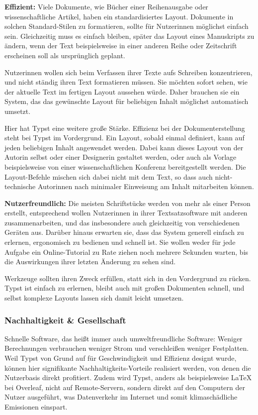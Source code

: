 \documentclass[11pt, a4paper]{article}
\newcommand{\gender}{\raisebox{-.25em}{*}}
\begin{document}
\textbf{Effizient:} Viele Dokumente, wie Bücher einer Reihenausgabe oder wissenschaftliche Artikel, haben ein standardisiertes Layout. Dokumente in solchen Standard-Stilen zu formatieren, sollte für Nutzer\gender{}innen möglichst einfach sein. Gleichzeitig muss es einfach bleiben, später das Layout eines Manuskripts zu ändern, wenn der Text beispielsweise in einer anderen Reihe oder Zeitschrift erscheinen soll als ursprünglich geplant.

Nutzer\gender{}innen wollen sich beim Verfassen ihrer Texte aufs Schreiben konzentrieren, und nicht  ständig ihren Text formatieren müssen. Sie möchten sofort sehen, wie der aktuelle Text im fertigen Layout aussehen würde. Daher brauchen sie ein System, das das gewünschte Layout für beliebigen Inhalt möglichst automatisch umsetzt.

Hier hat Typst eine weitere große Stärke. Effizienz bei der Dokumenterstellung steht bei Typst im Vordergrund. Ein Layout, sobald einmal definiert, kann auf jeden beliebigen Inhalt angewendet werden. Dabei kann dieses Layout von der\gender{} Autor\gender{}in selbst oder einer\gender{} Designer\gender{}in gestaltet werden, oder auch als Vorlage beispielsweise von einer wissenschaftlichen Konferenz bereitgestellt werden. Die Layout-Befehle mischen sich dabei nicht mit dem Text, so dass auch nicht-technische Autor\gender{}innen nach minimaler Einweisung am Inhalt mitarbeiten können.

\textbf{Nutzerfreundlich:} Die meisten Schriftstücke werden von mehr als einer Person erstellt, entsprechend wollen Nutzer\gender{}innen in ihrer Textsatzsoftware mit anderen zusammenarbeiten, und das insbesondere auch gleichzeitig von verschiedenen Geräten aus. Darüber hinaus erwarten sie, dass das System generell einfach zu erlernen, ergonomisch zu bedienen und schnell ist. Sie wollen weder für jede Aufgabe ein Online-Tutorial zu Rate ziehen noch mehrere Sekunden warten, bis die Auswirkungen ihrer letzten Änderung zu sehen sind.

Werkzeuge sollten ihren Zweck erfüllen, statt sich in den Vordergrund zu rücken. Typst ist einfach zu erlernen, bleibt auch mit großen Dokumenten schnell, und selbst komplexe Layouts lassen sich damit leicht umsetzen.

\subsubsection*{Nachhaltigkeit \& Gesellschaft}

Schnelle Software, das heißt immer auch umweltfreundliche Software: Weniger Berechnungen verbrauchen weniger Strom und verschleißen weniger Festplatten. Weil Typst von Grund auf für Geschwindigkeit und Effizienz designt wurde, können hier signifikante Nachhaltigkeits-Vorteile realisiert werden, von denen die Nutzerbasis direkt profitiert. Zudem wird Typst, anders als beispielsweise LaTeX bei Overleaf,  nicht auf Remote-Servern, sondern direkt auf den Computern der Nutzer ausgeführt, was Datenverkehr im Internet und somit klimaschädliche Emissionen einspart.
\end{document}

